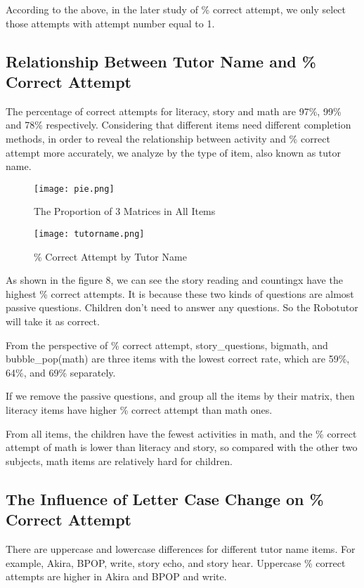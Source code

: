 \documentclass[hyperref]{ctexart}
\begin{document}
\begin{multicols}{2}
    
    
    According to the above, in the later study of \% correct attempt, we only select those attempts with attempt number equal to 1.


	\subsection{Relationship Between Tutor Name and \% Correct Attempt}
	The percentage of correct attempts for literacy, story and math are 97\%, 99\% and 78\% respectively. Considering that different items need different completion methods, in order to reveal the relationship between activity and \% correct attempt more accurately, we analyze by the type of item, also known as tutor name.
	
		\begin{figure}[H]
    \small
    \centering
    \texttt{[image: pie.png]}
    \caption{The Proportion of 3 Matrices in All Items
} \label{fig:aa}
    \end{figure}
    
	\begin{figure}[H]
    \small
    \centering
    \texttt{[image: tutorname.png]}
    \caption{\% Correct Attempt by Tutor Name
} \label{fig:aa}
    \end{figure}
	
	As shown in the figure 8, we can see the story reading and countingx have the highest \% correct attempts. It is because these two kinds of questions are almost passive questions. Children don't need to answer any questions. So the Robotutor will take it as correct.
	
	
    From the perspective of \% correct attempt, story\_questions, bigmath, and bubble\_pop(math) are three items with the lowest correct rate, which are 59\%, 64\%, and 69\% separately.
    
    
    If we remove the passive questions, and group all the items by their matrix, then literacy items have higher \% correct attempt than math ones.
    
    
    From all items, the children have the fewest activities in math, and the \% correct attempt of math is lower than literacy and story, so compared with the other two subjects, math items are relatively hard for children.


\subsection{The Influence of Letter Case Change on \% Correct Attempt}
There are uppercase and lowercase differences for different tutor name items. For example, Akira, BPOP, write, story echo, and story hear. Uppercase \% correct attempts are higher in Akira and BPOP and write.



\end{multicols}
\end{document}
